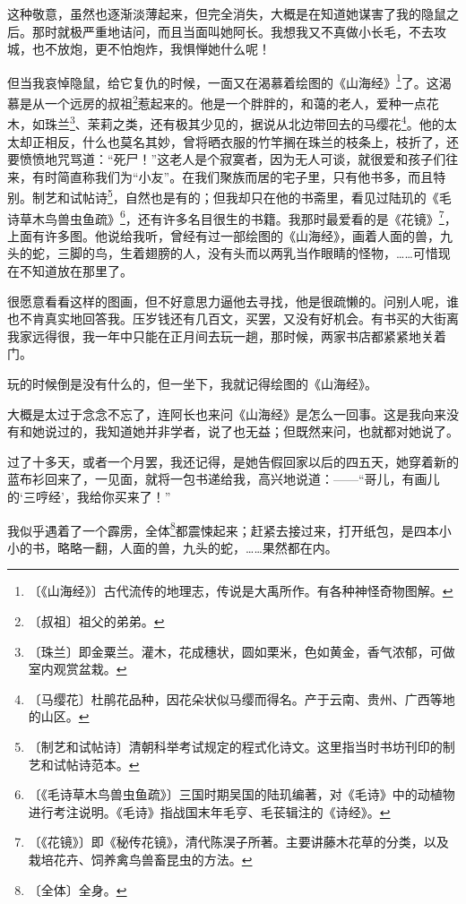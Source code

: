 \documentclass[12pt,UTF-8,openany]{ctexbook}
\begin{document}
\begin{large}
    这种敬意，虽然也逐渐淡薄起来，但完全消失，大概是在知道她谋害了我的隐鼠之后。那时就极严重地诘问，而且当面叫她阿长。我想我又不真做小长毛，不去攻城，也不放炮，更不怕炮炸，我惧惮她什么呢！
    
    但当我哀悼隐鼠，给它复仇的时候，一面又在渴慕着绘图的《山海经》\footnote{〔《山海经》〕古代流传的地理志，传说是大禹所作。有各种神怪奇物图解。}了。这渴慕是从一个远房的叔祖\footnote{〔叔祖〕祖父的弟弟。}惹起来的。他是一个胖胖的，和蔼的老人，爱种一点花木，如珠兰\footnote{〔珠兰〕即金粟兰。灌木，花成穗状，圆如栗米，色如黄金，香气浓郁，可做室内观赏盆栽。}、茉莉之类，还有极其少见的，据说从北边带回去的马缨花\footnote{〔马缨花〕杜鹃花品种，因花朵状似马缨而得名。产于云南、贵州、广西等地的山区。}。他的太太却正相反，什么也莫名其妙，曾将晒衣服的竹竿搁在珠兰的枝条上，枝折了，还要愤愤地咒骂道：“死尸！”这老人是个寂寞者，因为无人可谈，就很爱和孩子们往来，有时简直称我们为“小友”。在我们聚族而居的宅子里，只有他书多，而且特别。制艺和试帖诗\footnote{〔制艺和试帖诗〕清朝科举考试规定的程式化诗文。这里指当时书坊刊印的制艺和试帖诗范本。}，自然也是有的；但我却只在他的书斋里，看见过陆玑的《毛诗草木鸟兽虫鱼疏》\footnote{〔《毛诗草木鸟兽虫鱼疏》〕三国时期吴国的陆玑编著，对《毛诗》中的动植物进行考注说明。《毛诗》指战国末年毛亨、毛苌辑注的《诗经》。}，还有许多名目很生的书籍。我那时最爱看的是《花镜》\footnote{〔《花镜》〕即《秘传花镜》，清代陈淏子所著。主要讲藤木花草的分类，以及栽培花卉、饲养禽鸟兽畜昆虫的方法。}，上面有许多图。他说给我听，曾经有过一部绘图的《山海经》，画着人面的兽，九头的蛇，三脚的鸟，生着翅膀的人，没有头而以两乳当作眼睛的怪物，……可惜现在不知道放在那里了。
    
    很愿意看看这样的图画，但不好意思力逼他去寻找，他是很疏懒的。问别人呢，谁也不肯真实地回答我。压岁钱还有几百文，买罢，又没有好机会。有书买的大街离我家远得很，我一年中只能在正月间去玩一趟，那时候，两家书店都紧紧地关着门。
    
    玩的时候倒是没有什么的，但一坐下，我就记得绘图的《山海经》。
    
    大概是太过于念念不忘了，连阿长也来问《山海经》是怎么一回事。这是我向来没有和她说过的，我知道她并非学者，说了也无益；但既然来问，也就都对她说了。
    
    过了十多天，或者一个月罢，我还记得，是她告假回家以后的四五天，她穿着新的蓝布衫回来了，一见面，就将一包书递给我，高兴地说道：——“哥儿，有画儿的‘三哼经’，我给你买来了！”
    
    我似乎遇着了一个霹雳，全体\footnote{〔全体〕全身。}都震悚起来；赶紧去接过来，打开纸包，是四本小小的书，略略一翻，人面的兽，九头的蛇，……果然都在内。
    

\end{large}
\end{document}
